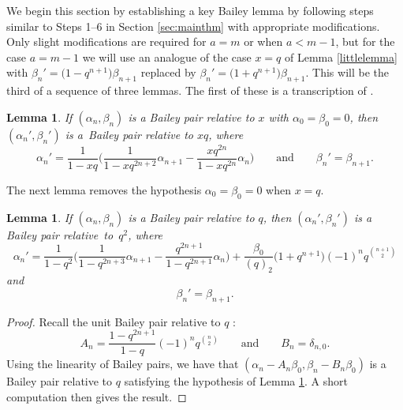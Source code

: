 \documentclass[pdftex]{sigma}
\newtheorem{Lemma}[Theorem]{Lemma}
\numberwithin{equation}{section}
\begin{document}
We begin this section by establishing a key Bailey lemma by following steps similar to Steps 1--6 in Section \ref{sec:mainthm} with appropriate modifications. Only slight modifications are required for $a=m$ or when $a < m-1$, but for the case $a=m-1$ we will use an analogue of the case $x=q$ of Lemma \ref{littlelemma} with $\beta_n' = \bigl(1-q^{n+1}\bigr)\beta_{n+1}$ replaced by $\beta_n' = \bigl(1+q^{n+1}\bigr)\beta_{n+1}$. This will be the third of a sequence of three lemmas. The first of these is a transcription of \cite[Lemma 3.3]{Lo1}.
\begin{Lemma} \label{falselemma1}
If $(\alpha_n,\beta_n)$ is a Bailey pair relative to $x$ with $\alpha_0 = \beta_0 = 0$, then $(\alpha_n',\beta_n')$ is a~Bailey pair relative to $xq$, where
\begin{equation*}
	\alpha_n' = \frac{1}{1-xq} \biggl( \frac{1}{1-xq^{2n+2}}\alpha_{n+1} - \frac{xq^{2n}}{1-xq^{2n}}\alpha_n \biggr)
\qquad
\text{and}
\qquad
	\beta_n' = \beta_{n+1}.
\end{equation*}
\end{Lemma}
The next lemma removes the hypothesis $\alpha_0 = \beta_0 = 0$ when $x=q$.
\begin{Lemma} \label{falselemma2}
If $(\alpha_n,\beta_n)$ is a Bailey pair relative to $q$, then $(\alpha_n',\beta_n')$ is a Bailey pair relative~to~$q^2$, where
\begin{equation*}
	\alpha_n' = \frac{1}{1-q^2} \biggl( \frac{1}{1-q^{2n+3}}\alpha_{n+1} - \frac{q^{2n+1}}{1-q^{2n+1}}\alpha_n \biggr) + \frac{\beta_0}{(q)_2} \bigl(1+q^{n+1}\bigr)(-1)^nq^{\binom{n+1}{2}}
\end{equation*}
and
\begin{equation*}
	\beta_n' = \beta_{n+1}.
\end{equation*}
\end{Lemma}

\begin{proof}
Recall the unit Bailey pair relative to $q$ \cite[equations~(2.12) and (2.13), $a \mapsto q$]{Andmultiple}:
\begin{equation*}
	A_n = \frac{1-q^{2n+1}}{1-q}(-1)^nq^{\binom{n}{2}}
\qquad
\text{and}
\qquad
	B_n = \delta_{n,0}.
\end{equation*}
Using the linearity of Bailey pairs, we have that $(\alpha_n - A_n\beta_0,\beta_n - B_n\beta_0)$ is a Bailey pair relative to $q$ satisfying the hypothesis of Lemma \ref{falselemma1}. A short computation then gives the result.
\end{proof}
\end{document}
